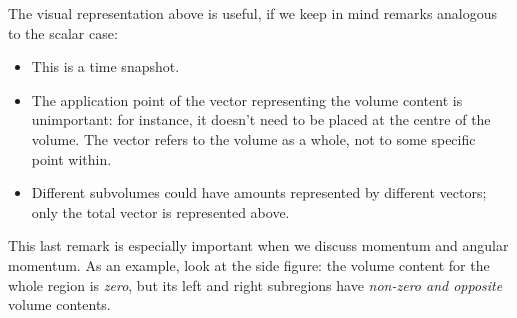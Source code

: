\documentclass[a4paper,12pt,%
onecolumn,oneside,%
british%
]{memoir}
\renewcommand*{\|}[1][]{\nonscript\:#1\vert\nonscript\:\mathopen{}}
\begin{document}
The visual representation above is useful, if we keep in mind remarks analogous to the scalar case:
\begin{itemize}
\item This is a time snapshot.
\item\label{item:applicationpoint}The application point of the vector representing the volume content is unimportant: for instance, it doesn't need to be placed at the centre of the volume. The vector refers to the volume as a whole, not to some specific point within.
\item Different subvolumes could have amounts represented by different vectors; only the total vector is represented above.
\end{itemize}
%
%
This last remark is especially important when we discuss momentum and angular momentum. As an example, look at the side figure:
the volume content for the whole region is \emph{zero}, but its left and right subregions have \emph{non-zero and opposite} volume contents.
%
\end{document}
